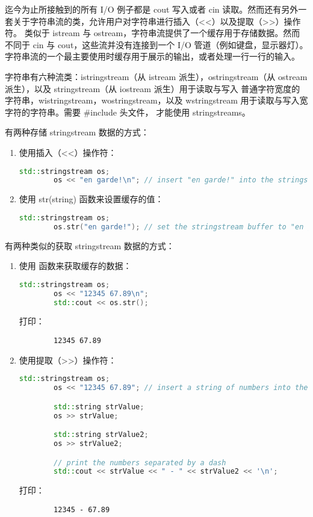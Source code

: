 \documentclass[../../LearnCpp.tex]{subfiles}
\begin{document}

迄今为止所接触到的所有 I/O 例子都是 cout 写入或者 cin 读取。然而还有另外一套关于字符串流的类，允许用户对字符串进行插入（<<）以及提取（>>）操作符。
类似于 istream 与 ostream，字符串流提供了一个缓存用于存储数据。然而不同于 cin 与 cout，这些流并没有连接到一个 I/O 管道（例如键盘，显示器灯）。
字符串流的一个最主要使用时缓存用于展示的输出，或者处理一行一行的输入。

字符串有六种流类：istringstream（从 istream 派生），ostringstream（从 ostream 派生），以及 stringstream（从 iostream 派生）用于读取与写入
普通字符宽度的字符串，wistringstream，wostringstream，以及 wstringstream 用于读取与写入宽字符的字符串。需要 \#include  头文件，
才能使用 stringstreams。

有两种存储 stringstream 数据的方式：

\begin{enumerate}
      \item 使用插入（<<）操作符：
            \begin{lstlisting}[language=C++]
        std::stringstream os;
        os << "en garde!\n"; // insert "en garde!" into the stringstream
        \end{lstlisting}
      \item 使用 str(string) 函数来设置缓存的值：
            \begin{lstlisting}[language=C++]
        std::stringstream os;
        os.str("en garde!"); // set the stringstream buffer to "en garde!"
        \end{lstlisting}
\end{enumerate}

有两种类似的获取 stringstream 数据的方式：

\begin{enumerate}
      \item 使用  函数来获取缓存的数据：
            \begin{lstlisting}[language=C++]
        std::stringstream os;
        os << "12345 67.89\n";
        std::cout << os.str();
        \end{lstlisting}
            打印：
            \begin{lstlisting}
        12345 67.89
        \end{lstlisting}
      \item 使用提取（>>）操作符：
            \begin{lstlisting}[language=C++]
        std::stringstream os;
        os << "12345 67.89"; // insert a string of numbers into the stream

        std::string strValue;
        os >> strValue;

        std::string strValue2;
        os >> strValue2;

        // print the numbers separated by a dash
        std::cout << strValue << " - " << strValue2 << '\n';
        \end{lstlisting}
            打印：
            \begin{lstlisting}
        12345 - 67.89
        \end{lstlisting}
\end{enumerate}
\end{document}
